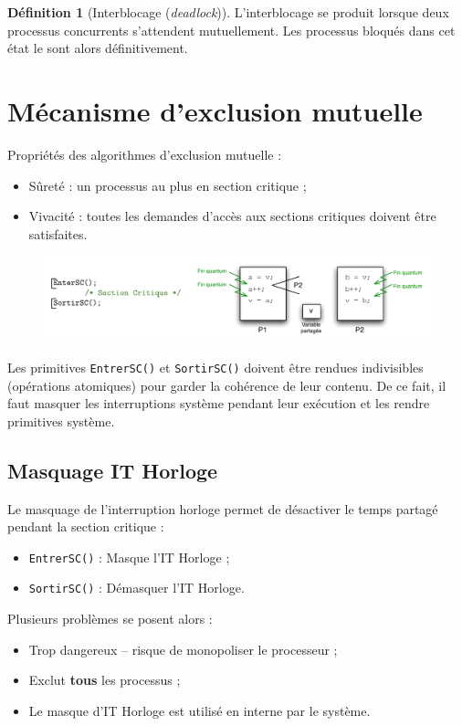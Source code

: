 \documentclass[11pt,english,french]{scrreprt}
\theoremstyle{remark}
\theoremstyle{definition}
\newtheorem*{def*}{Définition}
\begin{document}
\begin{def*}[Interblocage (\emph{deadlock})]
	L'interblocage se produit lorsque deux processus concurrents s'attendent mutuellement. Les processus bloqués dans cet état le sont alors définitivement.
\end{def*}

\section{Mécanisme d'exclusion mutuelle}
Propriétés des algorithmes d'exclusion mutuelle :
\begin{itemize}
	\item Sûreté : un processus au plus en section critique ;
	\item Vivacité : toutes les demandes d'accès aux sections critiques doivent être satisfaites.
\end{itemize}

\begin{figure}[h!]
	\center
	\vspace{-10pt}
	\includegraphics[scale=.85]{img/SC}
	\vspace{-10pt}
\end{figure}

Les primitives \lstinline!EntrerSC()! et \lstinline!SortirSC()! doivent être rendues indivisibles (opérations atomiques) pour garder la cohérence de leur contenu. De ce fait, il faut masquer les interruptions système pendant leur exécution et les rendre primitives système.

\subsection{Masquage IT Horloge}
Le masquage de l'interruption horloge permet de désactiver le temps partagé pendant la section critique : \begin{itemize}
	\item \lstinline!EntrerSC()! : Masque l'IT Horloge ;
	\item \lstinline!SortirSC()! : Démasquer l'IT Horloge.
\end{itemize}

Plusieurs problèmes se posent alors :
\begin{itemize}
	\item Trop dangereux -- risque de monopoliser le processeur ;
	\item Exclut \textbf{tous} les processus ;
	\item Le masque d'IT Horloge est utilisé en interne par le système.
\end{itemize}
\end{document}
